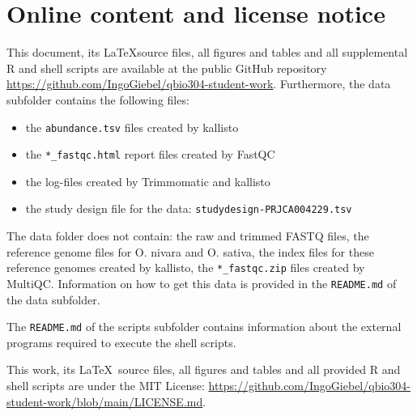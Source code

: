 \section{Online content and license notice}

This document, its \LaTeX source files, all figures and tables and all supplemental R and shell scripts are available at the public GitHub repository \url{https://github.com/IngoGiebel/qbio304-student-work}. Furthermore, the data subfolder contains the following files:
\begin{itemize}
    \item the \verb|abundance.tsv| files created by kallisto
    \item the \verb|*_fastqc.html| report files created by FastQC
    \item the log-files created by Trimmomatic and kallisto
    \item the study design file for the data: \verb|studydesign-PRJCA004229.tsv|
\end{itemize}
The data folder does not contain: the raw and trimmed FASTQ files, the reference genome files for O. nivara and O. sativa, the index files for these reference genomes created by kallisto, the \verb|*_fastqc.zip| files created by MultiQC. Information on how to get this data is provided in the \verb|README.md| of the data subfolder.

The \verb|README.md| of the scripts subfolder contains information about the external programs required to execute the shell scripts.

This work, its \LaTeX\ source files, all figures and tables and all provided R and shell scripts are under the MIT License: \url{https://github.com/IngoGiebel/qbio304-student-work/blob/main/LICENSE.md}.